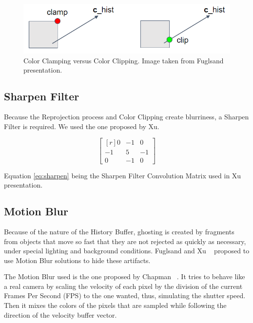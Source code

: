 \documentclass{cslthse-msc}
\begin{document}
\begin{figure}[!hbt]
	\centering
	\includegraphics[scale=0.4]{images/clipping_box.png}
	\caption{Color Clamping versus Color Clipping. Image taken from Fuglsand presentation. \protect\cite{Fuglsand2016}}\label{fig:clippingbox}
\end{figure}


\subsection{Sharpen Filter} 
Because the Reprojection process and Color Clipping create blurriness, a Sharpen Filter is required. We used the one proposed by Xu. ~\cite{XU2016}

\begin{equation} \label{eq:sharpen}
\begin{bmatrix*}[r]
0 & -1 &  0 \\
-1 &  5 & -1 \\
0 & -1 &  0
\end{bmatrix*}
\end{equation}

Equation \ref{eq:sharpen} being the Sharpen Filter Convolution Matrix  used in Xu presentation. \protect\cite{XU2016}

\subsection{Motion Blur}
Because of the nature of the History Buffer, ghosting is created by fragments from objects that move so fast that they are not rejected as quickly as necessary, under special lighting and background conditions. Fuglsand and Xu ~\cite{Fuglsand2016,XU2016} proposed to use Motion Blur solutions to hide these artifacts.

The Motion Blur used is the one proposed by Chapman ~\cite{Chapman2012}. It tries to behave like a real camera by scaling the velocity of each pixel by the division of the current Frames Per Second (FPS) to the one wanted, thus, simulating the shutter speed. Then it mixes the colors of the pixels that are sampled while following the direction of the velocity buffer vector.
\end{document}
